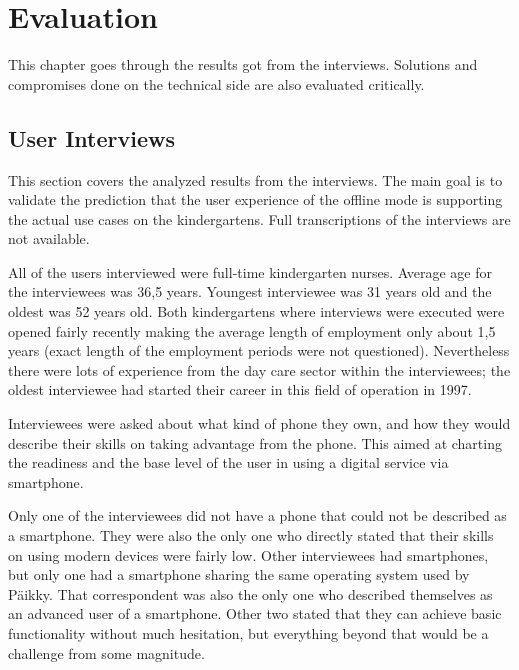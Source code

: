 \chapter{Evaluation}
\label{chap:evaluation}

This chapter goes through the results got from the interviews. Solutions and compromises done on the technical side are also evaluated critically.


\section{User Interviews}


This section covers the analyzed results from the interviews. The main goal is to validate the prediction that the user experience of the offline mode is supporting the actual use cases on the kindergartens. Full transcriptions of the interviews are not available.

All of the users interviewed were full-time kindergarten nurses. Average age for the interviewees was 36,5 years. Youngest interviewee was 31 years old and the oldest was 52 years old. Both kindergartens where interviews were executed were opened fairly recently making the average length of employment only about 1,5 years (exact length of the employment periods were not questioned). Nevertheless there were lots of experience from the day care sector within the interviewees; the oldest interviewee had started their career in this field of operation in 1997.

Interviewees were asked about what kind of phone they own, and how they would describe their skills on taking advantage from the phone. This aimed at charting the readiness and the base level of the user in using a digital service via smartphone. 

Only one of the interviewees did not have a phone that could not be described as a smartphone. They were also the only one who directly stated that their skills on using modern devices were fairly low. Other interviewees had smartphones, but only one had a smartphone sharing the same operating system used by Päikky. That correspondent was also the only one who described themselves as an advanced user of a smartphone. Other two stated that they can achieve basic functionality without much hesitation, but everything beyond that would be a challenge from some magnitude. 

